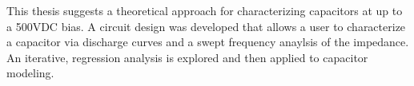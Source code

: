This thesis suggests a theoretical approach for characterizing capacitors at up to a 500VDC bias. A circuit design was developed that allows a user to characterize a capacitor via discharge curves and a swept frequency anaylsis of the impedance. An iterative, regression analysis is explored and then applied to capacitor modeling.
\label{sec:abstract}

